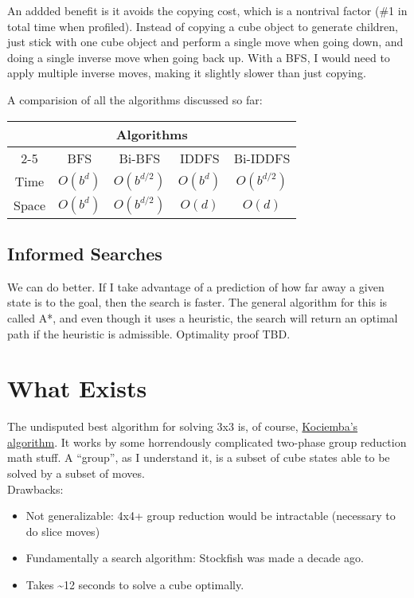 \documentclass[11pt, oneside]{article}
\begin{document}
An addded benefit is it avoids the copying cost, which is a nontrival factor (\#1 in total time when profiled).
Instead of copying a cube object to generate children, just stick with one cube object and perform a single move when going down,
and doing a single inverse move when going back up. With a BFS, I would need to apply multiple inverse moves,
making it slightly slower than just copying.

A comparision of all the algorithms discussed so far:

\begin{tabular} {| c | c | c | c | c |}
  \multicolumn{5}{c}{Algorithms} \\ \cline{2-5}
  \multicolumn{1}{c |}{} & BFS & Bi-BFS & IDDFS & Bi-IDDFS \\ \hline
  Time & \( O(b^d) \) & \( O(b^{d/2}) \) & \( O(b^d) \) & \( O(b^{d/2}) \) \\ \hline
  Space & \(O(b^d) \) & \(O(b^{d/2}) \) & \( O(d) \) & \( O(d) \) \\ \hline
\end{tabular}

\subsection{Informed Searches}
We can do better. If I take advantage of a prediction of how far away a given state is to the goal, then the search is faster.
The general algorithm for this is called A*, and even though it uses a heuristic, the search will return an optimal path if
the heuristic is admissible. Optimality proof TBD.

\section{What Exists}
The undisputed best algorithm for solving 3x3 is, of course, \href{http://kociemba.org/cube.htm}{Kociemba's algorithm}.
It works by some horrendously complicated two-phase group reduction math stuff. A ``group'', as I understand it,
is a subset of cube states able to be solved by a subset of moves. \\

Drawbacks:
\begin{itemize}
  \item Not generalizable: 4x4+ group reduction would be intractable (necessary to do slice moves)
  \item Fundamentally a search algorithm: Stockfish was made a decade ago.
  \item Takes \textasciitilde 12 seconds to solve a cube optimally.
\end{itemize}
\end{document}
